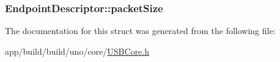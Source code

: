 \hypertarget{struct_endpoint_descriptor_a2e22c1c94c5f4637abae1184b35cab9c}{
\subsubsection[{packet\-Size}]{ Endpoint\-Descriptor\-::packet\-Size}}\label{struct_endpoint_descriptor_a2e22c1c94c5f4637abae1184b35cab9c}


The documentation for this struct was generated from the following file\-:\begin{DoxyCompactItemize}
\item 
app/build/build/uno/core/\hyperlink{_u_s_b_core_8h}{U\-S\-B\-Core.\-h}\end{DoxyCompactItemize}
